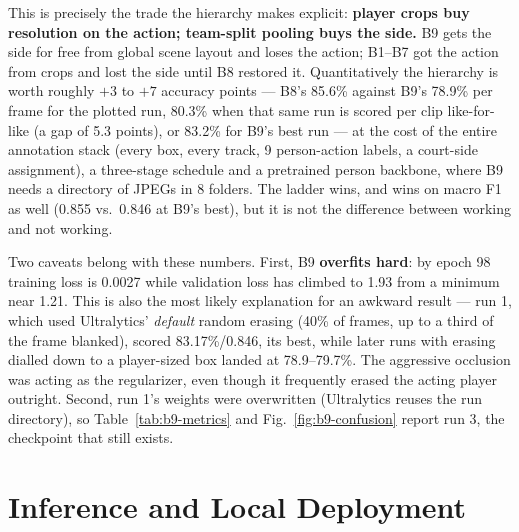 \documentclass[9pt,a4paper,twocolumn,twoside]{tau-class/tau}
\begin{document}
This is precisely the trade the hierarchy makes explicit: \textbf{player crops buy resolution on the action; team-split pooling buys the side.} B9 gets the side for free from global scene layout and loses the action; B1--B7 got the action from crops and lost the side until B8 restored it. Quantitatively the hierarchy is worth roughly $+3$ to $+7$ accuracy points --- B8's 85.6\% against B9's 78.9\% per frame for the plotted run, 80.3\% when that same run is scored per clip like-for-like (a gap of 5.3 points), or 83.2\% for B9's best run --- at the cost of the entire annotation stack (every box, every track, 9 person-action labels, a court-side assignment), a three-stage schedule and a pretrained person backbone, where B9 needs a directory of JPEGs in 8 folders. The ladder wins, and wins on macro F1 as well (0.855 vs.\ 0.846 at B9's best), but it is not the difference between working and not working.

Two caveats belong with these numbers. First, B9 \textbf{overfits hard}: by epoch 98 training loss is 0.0027 while validation loss has climbed to 1.93 from a minimum near 1.21. This is also the most likely explanation for an awkward result --- run 1, which used Ultralytics' \emph{default} random erasing (40\% of frames, up to a third of the frame blanked), scored 83.17\%/0.846, its best, while later runs with erasing dialled down to a player-sized box landed at 78.9--79.7\%. The aggressive occlusion was acting as the regularizer, even though it frequently erased the acting player outright. Second, run 1's weights were overwritten (Ultralytics reuses the run directory), so Table~\ref{tab:b9-metrics} and Fig.~\ref{fig:b9-confusion} report run 3, the checkpoint that still exists.

\section{Inference and Local Deployment}
\end{document}
